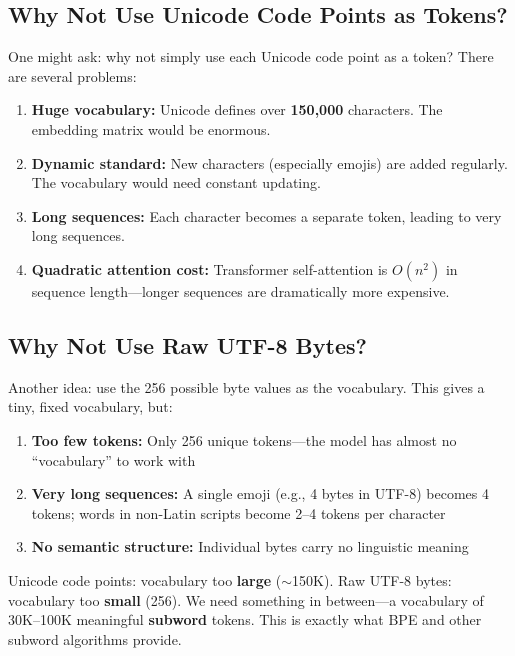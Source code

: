 \documentclass[11pt,a4paper]{article}
\begin{document}
\subsection{Why Not Use Unicode Code Points as Tokens?}

One might ask: why not simply use each Unicode code point as a token? There are several problems:

\begin{enumerate}[leftmargin=1.5em]
    \item \textbf{Huge vocabulary:} Unicode defines over \textbf{150,000} characters. The embedding matrix would be enormous.
    \item \textbf{Dynamic standard:} New characters (especially emojis) are added regularly. The vocabulary would need constant updating.
    \item \textbf{Long sequences:} Each character becomes a separate token, leading to very long sequences.
    \item \textbf{Quadratic attention cost:} Transformer self-attention is $O(n^2)$ in sequence length---longer sequences are dramatically more expensive.
\end{enumerate}

\subsection{Why Not Use Raw UTF-8 Bytes?}

Another idea: use the 256 possible byte values as the vocabulary. This gives a tiny, fixed vocabulary, but:

\begin{enumerate}[leftmargin=1.5em]
    \item \textbf{Too few tokens:} Only 256 unique tokens---the model has almost no ``vocabulary'' to work with
    \item \textbf{Very long sequences:} A single emoji (e.g., 4 bytes in UTF-8) becomes 4 tokens; words in non-Latin scripts become 2--4 tokens per character
    \item \textbf{No semantic structure:} Individual bytes carry no linguistic meaning
\end{enumerate}

\begin{tcolorbox}[warnbox={The Dilemma}]
Unicode code points: vocabulary too \textbf{large} ($\sim$150K). Raw UTF-8 bytes: vocabulary too \textbf{small} (256). We need something in between---a vocabulary of 30K--100K meaningful \textbf{subword} tokens. This is exactly what BPE and other subword algorithms provide.
\end{tcolorbox}
\end{document}
